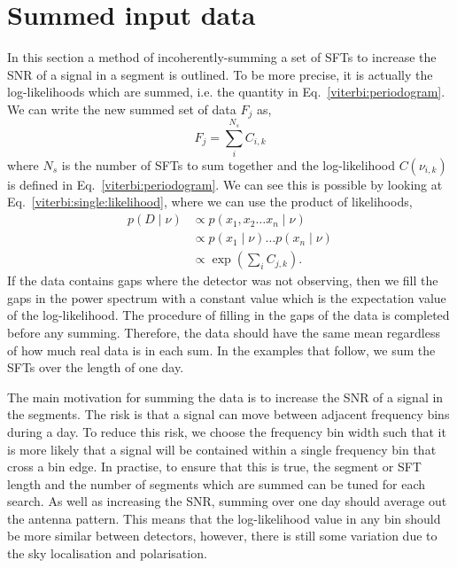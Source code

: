 \section{\label{viterbi:sumdata}Summed input data}
%
%
In this section a method of incoherently-summing a set of \acp{SFT} to increase the \ac{SNR} of a signal in a segment is outlined. To be more precise, it is actually the log-likelihoods which are summed, i.e. the quantity in Eq.~\ref{viterbi:periodogram}. We can write the new summed set of data $F_j$ as,
%
\begin{equation}
F_j = \sum_{i}^{N_s}C_{i,k}
\end{equation}
%
where $N_s$ is the number of \acp{SFT} to sum together and the log-likelihood $C(\nu_{i,k})$ is defined in Eq.~\ref{viterbi:periodogram}.
We can see this is possible by looking at Eq.~\ref{viterbi:single:likelihood}, where we can use the product of likelihoods,
%
\begin{equation}
\begin{split}
p(D \mid \nu) &\propto p(x_1,x_2 \ldots x_n \mid \nu) \\
&\propto p(x_1 \mid \nu) \ldots p(x_n \mid \nu) \\
&\propto \exp{\left( \sum_i C_{j,k}\right)}.
\end{split}
\end{equation}
%
If the data contains gaps where the detector was not observing, then we fill the gaps in the power spectrum with a constant value which is the expectation value of the log-likelihood. The procedure of filling in the gaps of the data is completed before any summing.  Therefore, the data should have the same mean regardless of how much real data is in each sum. In the examples that follow, we sum the \acp{SFT} over the length of one day.

The main motivation for summing the data is to increase the \ac{SNR} of a signal in the segments. The risk is that a signal can move between adjacent frequency bins during a day. To reduce this risk, we choose the frequency bin width such that it is more likely that a signal will be contained within a single frequency bin that cross a bin edge. In practise, to ensure that this is true, the segment or \ac{SFT} length and the number of segments which are summed can be tuned for each search. As well as increasing the \ac{SNR}, summing over one day should average out the antenna pattern. This means that the log-likelihood value in any bin should be more similar between detectors, however, there is still some variation due to the sky localisation and polarisation.

